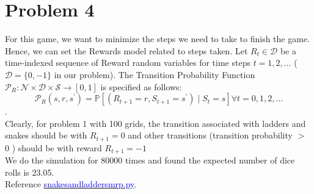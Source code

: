 \documentclass{article}
\begin{document}
\section*{Problem 4}
\hspace*{1em} For this game, we want to minimize the steps we need to take to finish the game. Hence, we can set the Rewards model related to steps taken. Let $R_{t}\in \mathcal{D}$ be a time-indexed sequence of Reward random variables for time steps $t=1,2, \ldots$ ($\mathcal{D}=\{0,-1\}$ in our problem). The Transition Probability Function $\mathcal{P}_{R}: \mathcal{N} \times \mathcal{D} \times \mathcal{S} \rightarrow[0,1]$
 is specified as follows:\\ $$\mathcal{P}_{R}\left(s, r, s^{\prime}\right)=\mathbb{P}\left[\left(R_{t+1}=r, S_{t+1}=s^{\prime}\right) \mid S_{t}=s\right] \forall t=0,1,2, \ldots$$.\\
Clearly, for problem 1 with 100 grids, the transition associated with ladders and snakes should be with $R_{t+1} = 0$ and other transitions (transition probability $>$ 0 ) should be with reward $R_{t+1} = -1$\\
We do the simulation for 80000 times and found the expected number of dice rolls is 23.05.\\
Reference \href{https://github.com/miaochin/RL-book/tree/master/CME241_assignments/assignment2}{\textcolor{blue}{snakes\textunderscore and\textunderscore ladders\textunderscore mrp.py}}.\\
\end{document}
